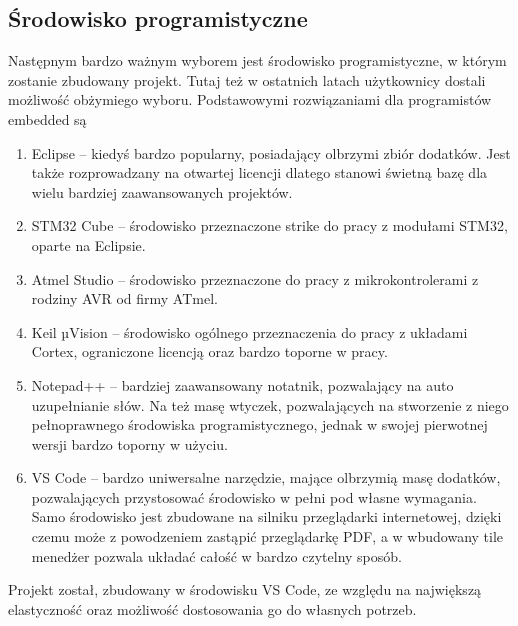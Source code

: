     \subsection{Środowisko programistyczne}
        Następnym bardzo ważnym wyborem jest środowisko programistyczne, w którym zostanie zbudowany projekt.
        Tutaj też w ostatnich latach użytkownicy dostali możliwość obżymiego wyboru.
        Podstawowymi rozwiązaniami dla programistów embedded są
        \begin{enumerate}
            \item Eclipse -- kiedyś bardzo popularny, posiadający olbrzymi zbiór dodatków. 
            Jest także rozprowadzany na otwartej licencji dlatego stanowi świetną bazę dla wielu bardziej zaawansowanych projektów.
            \item STM32 Cube -- środowisko przeznaczone strike do pracy z modułami STM32, oparte na Eclipsie.
            \item Atmel Studio -- środowisko przeznaczone do pracy z mikrokontrolerami z rodziny AVR od firmy ATmel.
            \item Keil µVision -- środowisko ogólnego przeznaczenia do pracy z układami Cortex, ograniczone licencją oraz bardzo toporne w pracy.
            \item Notepad++ -- bardziej zaawansowany notatnik, pozwalający na auto uzupełnianie słów. Na też masę wtyczek, pozwalających na stworzenie z niego pełnoprawnego środowiska programistycznego, jednak w swojej pierwotnej wersji bardzo toporny w użyciu.
            \item VS Code -- bardzo uniwersalne narzędzie, mające olbrzymią masę dodatków, pozwalających przystosować środowisko w pełni pod własne wymagania.
            Samo środowisko jest zbudowane na silniku przeglądarki internetowej, dzięki czemu może z powodzeniem zastąpić przeglądarkę PDF, a w wbudowany tile menedżer pozwala układać całość w bardzo czytelny sposób.
        \end{enumerate}
        Projekt został, zbudowany w środowisku VS Code, ze względu na największą elastyczność oraz możliwość dostosowania go do własnych potrzeb.


